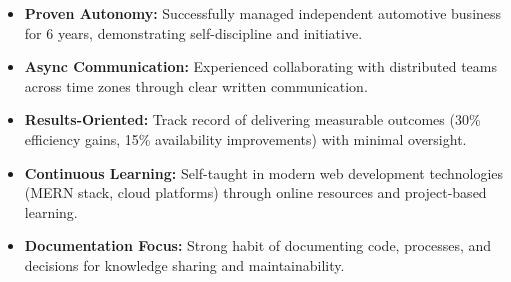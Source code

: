 \documentclass[10pt,letterpaper]{article}
\begin{document}
\begin{itemize}
    \item \textbf{Proven Autonomy:} Successfully managed independent automotive business for 6 years, demonstrating self-discipline and initiative.
    \item \textbf{Async Communication:} Experienced collaborating with distributed teams across time zones through clear written communication.
    \item \textbf{Results-Oriented:} Track record of delivering measurable outcomes (30\% efficiency gains, 15\% availability improvements) with minimal oversight.
    \item \textbf{Continuous Learning:} Self-taught in modern web development technologies (MERN stack, cloud platforms) through online resources and project-based learning.
    \item \textbf{Documentation Focus:} Strong habit of documenting code, processes, and decisions for knowledge sharing and maintainability.
\end{itemize}
\end{document}
